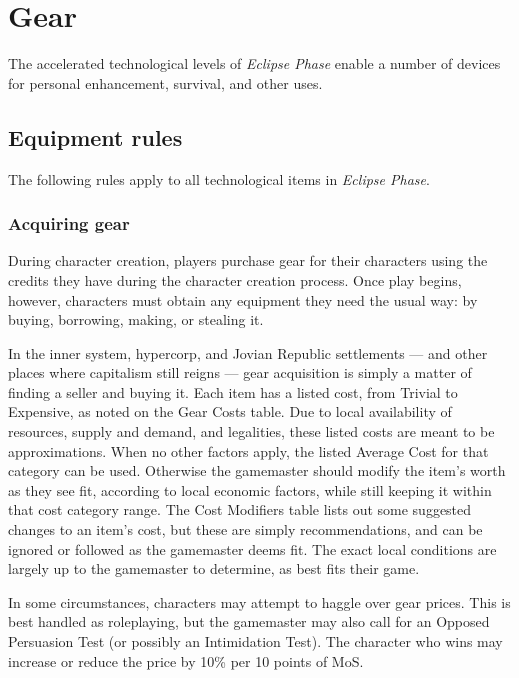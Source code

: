 
\chapter{Gear}
\label{cha:gear}

The accelerated technological levels of \emph{Eclipse Phase} enable a number of devices for personal enhancement, survival, and other uses.


\section{Equipment rules}
\label{sec:equipment-rules}

The following rules apply to all technological items in \emph{Eclipse Phase}.


\subsection{Acquiring gear}
\label{sec:acquiring-gear}

During character creation, players purchase gear for their characters using the credits they have during the character creation process. Once play begins, however, characters must obtain any equipment they need the usual way: by buying, borrowing, making, or stealing it.

In the inner system, hypercorp, and Jovian Republic settlements --- and other places where capitalism still reigns --- gear acquisition is simply a matter of finding a seller and buying it. Each item has a listed cost, from Trivial to Expensive, as noted on the Gear Costs table. Due to local availability of resources, supply and demand, and legalities, these listed costs are meant to be approximations. When no other factors apply, the listed Average Cost for that category can be used. Otherwise the gamemaster should modify the item’s worth as they see fit, according to local economic factors, while still keeping it within that cost category range. The Cost Modifiers table lists out some suggested changes to an item’s cost, but these are simply recommendations, and can be ignored or followed as the gamemaster deems fit. The exact local conditions are largely up to the gamemaster to determine, as best fits their game.

In some circumstances, characters may attempt to haggle over gear prices. This is best handled as roleplaying, but the gamemaster may also call for an Opposed Persuasion Test (or possibly an Intimidation Test). The character who wins may increase or reduce the price by 10\% per 10 points of MoS.

